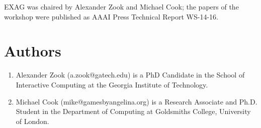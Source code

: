 \documentclass[10pt,a4paper]{article}
\begin{document}
EXAG was chaired by Alexander Zook and Michael Cook; the papers of the workshop were published as AAAI Press Technical Report WS-14-16.



\section*{Authors}
\begin{enumerate}
\item Alexander Zook (a.zook@gatech.edu) is a PhD Candidate in the School of Interactive Computing at the Georgia Institute of Technology.
\item Michael Cook (mike@gamesbyangelina.org) is a Research Associate and Ph.D. Student in the Department of Computing at Goldsmiths College, University of London.
\end{enumerate}
\end{document}
